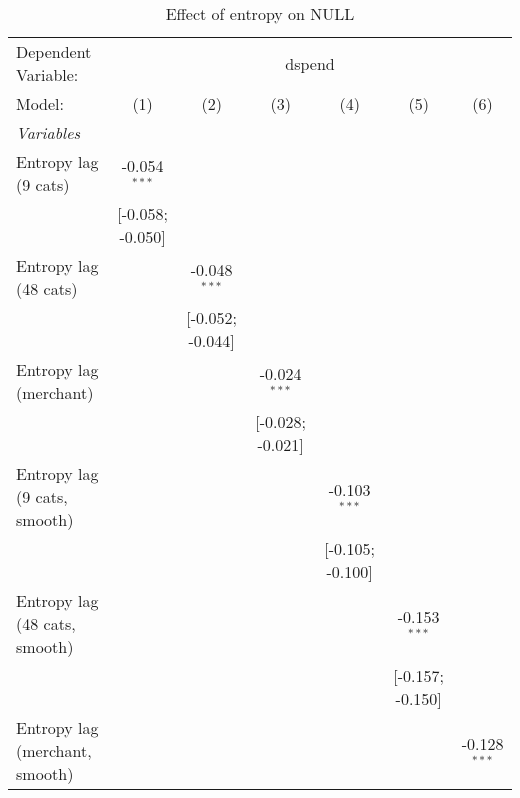 
\begin{table}[htbp]
   \centering
   \tiny
   \begin{threeparttable}[b]
      \caption{\label{tab:reg_dspend_cnz} Effect of entropy on NULL}
      \begin{tabular}{lcccccc}
         \tabularnewline \midrule \midrule
         Dependent Variable: & \multicolumn{6}{c}{dspend}\\
         Model:                         & (1)              & (2)              & (3)              & (4)              & (5)              & (6)\\  
         \midrule
         \emph{Variables}\\
         Entropy lag (9 cats)           & -0.054$^{***}$   &                  &                  &                  &                  &   \\   
                                        & [-0.058; -0.050] &                  &                  &                  &                  &   \\   
         Entropy lag (48 cats)          &                  & -0.048$^{***}$   &                  &                  &                  &   \\   
                                        &                  & [-0.052; -0.044] &                  &                  &                  &   \\   
         Entropy lag (merchant)         &                  &                  & -0.024$^{***}$   &                  &                  &   \\   
                                        &                  &                  & [-0.028; -0.021] &                  &                  &   \\   
         Entropy lag (9 cats, smooth)   &                  &                  &                  & -0.103$^{***}$   &                  &   \\   
                                        &                  &                  &                  & [-0.105; -0.100] &                  &   \\   
         Entropy lag (48 cats, smooth)  &                  &                  &                  &                  & -0.153$^{***}$   &   \\   
                                        &                  &                  &                  &                  & [-0.157; -0.150] &   \\   
         Entropy lag (merchant, smooth) &                  &                  &                  &                  &                  & -0.128$^{***}$\\   

\end{tabular}
\end{threeparttable}
\end{table}
